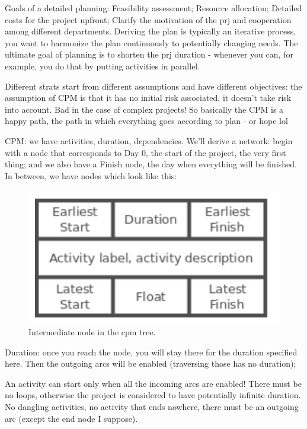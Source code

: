 \noindent Goals of a detailed planning: Feasibility assessment; Resource allocation; Detailed costs for the project upfront; Clarify the motivation of the prj and cooperation among different departments. Deriving the plan is typically an iterative process, you want to harmonize the plan continuously to potentially changing needs. The ultimate goal of planning is to shorten the prj duration - whenever you can, for example, you do that by putting activities in parallel.

\noindent Different strats start from different assumptions and have different objectives: the assumption of CPM is that it has no initial risk associated, it doesn't take risk into account. Bad in the case of complex projects! So basically the CPM is a happy path, the path in which everything goes according to plan - or hope lol

\noindent CPM: we have activities, duration, dependencies. We'll derive a network: begin with a node that corresponds to Day 0, the start of the project, the very first thing; and we also have a Finish node, the day when everything will be finished. In between, we have nodes which look like this: 

\begin{figure} [H]
    \centering
    \includegraphics[scale=0.5]{Figures/03/cpm00.png}
    \caption{Intermediate node in the cpm tree.}
    \label{fig:cpmnode}
\end{figure}

\noindent Duration: once you reach the node, you will stay there for the duration specified here. Then the outgoing arcs will be enabled (traversing those has no duration);

\noindent An activity can start only when all the incoming arcs are enabled! There must be no loops, otherwise the project is considered to have potentially infinite duration. No dangling activities, no activity that ends nowhere, there must be an outgoing arc (except the end node I suppose).

